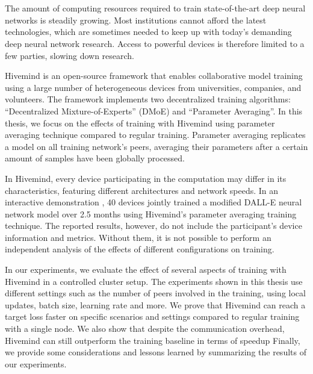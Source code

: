 \chapter{\abstractname}

The amount of computing resources required to train state-of-the-art deep neural networks is steadily growing.
Most institutions cannot afford the latest technologies, which are sometimes needed to keep up with today's demanding deep neural network research.
Access to powerful devices is therefore limited to a few parties, slowing down research.

Hivemind \cite{hivemind} is an open-source framework that enables collaborative model training using a large number of heterogeneous devices from universities, companies, and volunteers.
The framework implements two decentralized training algorithms: ``Decentralized Mixture-of-Experts'' (DMoE) and ``Parameter Averaging''.
In this thesis, we focus on the effects of training with Hivemind using parameter averaging technique compared to regular training.
Parameter averaging replicates a model on all training network's peers, averaging their parameters after a certain amount of samples have been globally processed.

In Hivemind, every device participating in the computation may differ in its characteristics, featuring different architectures and network speeds.
In an interactive demonstration \cite{hivemind}, 40 devices jointly trained a modified DALL-E \cite{ramesh2021zero} neural network model over 2.5 months using Hivemind's parameter averaging training technique.
The reported results, however, do not include the participant's device information and metrics.
Without them, it is not possible to perform an independent analysis of the effects of different configurations on training.

In our experiments, we evaluate the effect of several aspects of training with Hivemind in a controlled cluster setup.
The experiments shown in this thesis use different settings such as the number of peers involved in the training, using local updates, batch size, learning rate and more.
We prove that Hivemind can reach a target loss faster on specific scenarios and settings compared to regular training with a single node.
We also show that despite the communication overhead, Hivemind can still outperform the training baseline in terms of speedup
Finally, we provide some considerations and lessons learned by summarizing the results of our experiments.

